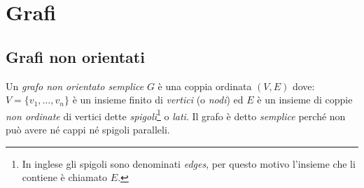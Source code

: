 \chapter{Grafi}

\section{Grafi non orientati}

\begin{defn}	
Un \emph{grafo non orientato semplice} $G$ è una coppia ordinata $(V,E)$ dove: $V=\{v_1,\dots,v_n\}$ è
un insieme finito di \emph{vertici} (o \emph{nodi}) ed $E$ è un insieme di coppie
\emph{non ordinate} di vertici dette \emph{spigoli}\footnote{In inglese gli spigoli sono denominati \emph{edges}, per
questo motivo l'insieme che li contiene è chiamato $E$.} o \emph{lati}. 
Il grafo è detto \emph{semplice} perché non può avere né cappi né spigoli paralleli.
\end{defn}

